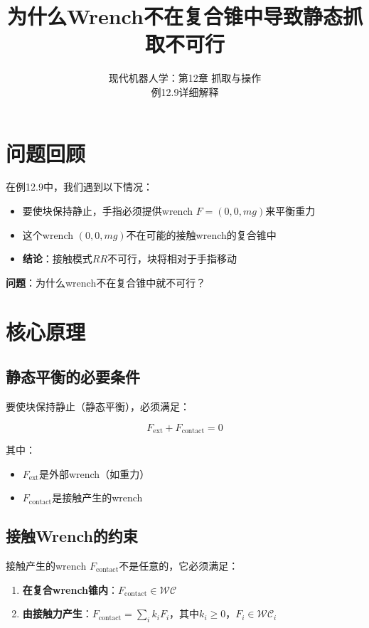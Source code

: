 \documentclass[12pt,a4paper]{article}
\title{为什么Wrench不在复合锥中导致静态抓取不可行}
\author{现代机器人学：第12章 抓取与操作\\
例12.9详细解释}
\date{}
\begin{document}
\maketitle

\section{问题回顾}

在例12.9中，我们遇到以下情况：

\begin{itemize}
    \item 要使块保持静止，手指必须提供wrench $F = (0, 0, mg)$来平衡重力
    \item 这个wrench $(0, 0, mg)$不在可能的接触wrench的复合锥中
    \item \textbf{结论}：接触模式$RR$不可行，块将相对于手指移动
\end{itemize}

\textbf{问题}：为什么wrench不在复合锥中就不可行？

\section{核心原理}

\subsection{静态平衡的必要条件}

要使块保持静止（静态平衡），必须满足：

\begin{equation}
F_{\text{ext}} + F_{\text{contact}} = 0
\label{eq:equilibrium}
\end{equation}

其中：
\begin{itemize}
    \item $F_{\text{ext}}$是外部wrench（如重力）
    \item $F_{\text{contact}}$是接触产生的wrench
\end{itemize}

\subsection{接触Wrench的约束}

接触产生的wrench $F_{\text{contact}}$不是任意的，它必须满足：

\begin{enumerate}
    \item \textbf{在复合wrench锥内}：$F_{\text{contact}} \in \mathcal{WC}$
    \item \textbf{由接触力产生}：$F_{\text{contact}} = \sum_i k_i F_i$，其中$k_i \geq 0$，$F_i \in \mathcal{WC}_i$
\end{enumerate}
\end{document}
